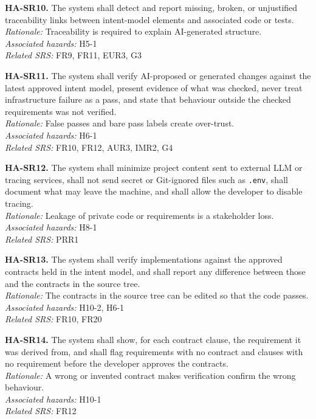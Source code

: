 \documentclass{article}
\begin{document}
\medskip
\noindent\textbf{HA-SR10.} The system shall detect and report missing, broken, or
unjustified traceability links between intent-model elements and associated
code or tests.\\
\textit{Rationale:} Traceability is required to explain AI-generated structure.\\
\textit{Associated hazards:} H5-1\\
\textit{Related SRS:} FR9, FR11, EUR3, G3

\medskip
\noindent\textbf{HA-SR11.} The system shall verify AI-proposed or generated changes
against the latest approved intent model, present evidence of what was checked,
never treat infrastructure failure as a pass, and state that behaviour outside
the checked requirements was not verified.\\
\textit{Rationale:} False passes and bare pass labels create over-trust.\\
\textit{Associated hazards:} H6-1\\
\textit{Related SRS:} FR10, FR12, AUR3, IMR2, G4

\medskip
\noindent\textbf{HA-SR12.} The system shall minimize project content sent to
external LLM or tracing services, shall not send secret or Git-ignored files
such as \texttt{.env}, shall document what may leave the machine, and shall
allow the developer to disable tracing.\\
\textit{Rationale:} Leakage of private code or requirements is a stakeholder
loss.\\
\textit{Associated hazards:} H8-1\\
\textit{Related SRS:} PRR1

\medskip
\noindent\textbf{HA-SR13.} The system shall verify implementations against the
approved contracts held in the intent model, and shall report any difference
between those and the contracts in the source tree.\\
\textit{Rationale:} The contracts in the source tree can be edited so that the
code passes.\\
\textit{Associated hazards:} H10-2, H6-1\\
\textit{Related SRS:} FR10, FR20

\medskip
\noindent\textbf{HA-SR14.} The system shall show, for each contract clause, the
requirement it was derived from, and shall flag requirements with no contract
and clauses with no requirement before the developer approves the contracts.\\
\textit{Rationale:} A wrong or invented contract makes verification confirm the
wrong behaviour.\\
\textit{Associated hazards:} H10-1\\
\textit{Related SRS:} FR12
\end{document}
